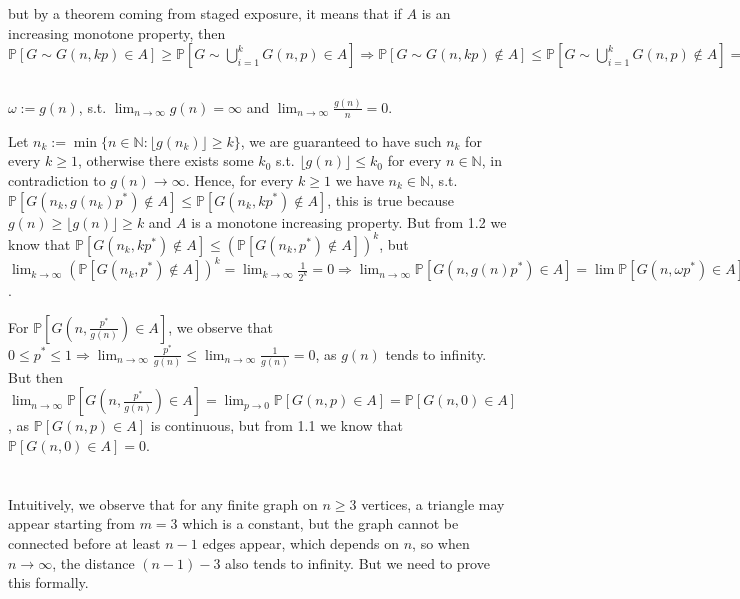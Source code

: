 \documentclass{article}
\begin{document}
but by a theorem coming from staged exposure, it means that if $A$ is an increasing monotone property, then $\mathbb{P}[G\sim{G(n,kp)}\in{A}]\geq{\mathbb{P}[G\sim\bigcup_{i=1}^{k}G(n,p)\in{A}]}\Rightarrow{\mathbb{P}[G\sim{G(n,kp)}\notin{A}]\leq{\mathbb{P}[G\sim\bigcup_{i=1}^{k}G(n,p)\notin{A}]}=(\mathbb{P}[G\sim{G(n,p)}\notin{A}]})^k$

\subsection{}
$\omega:=g(n)$, s.t. $\lim_{n\rightarrow\infty}g(n)=\infty$ and $\lim_{n\rightarrow\infty}\frac{g(n)}{n}=0$.

Let $n_k:=\min\{n\in\mathbb{N} : \lfloor{g(n_k)}\rfloor\geq{k}\}$, we are guaranteed to have such $n_k$ for every $k\geq{1}$, otherwise there exists some $k_0$ s.t. $\lfloor{g(n)}\rfloor\leq{k_0}$ for every $n\in\mathbb{N}$, in contradiction to $g(n)\rightarrow\infty$. 
Hence, for every $k\geq{1}$ we have $n_k\in\mathbb{N}$, s.t. $\mathbb{P}[G(n_k,g(n_k)p^{\ast})\notin{A}]\leq{\mathbb{P}[G(n_k,kp^{\ast})\notin{A}]}$, this is true because $g(n)\geq\lfloor{g(n)}\rfloor\geq{k}$ and $A$ is a monotone increasing property. But from 1.2 we know that $\mathbb{P}[G(n_k,kp^{\ast})\notin{A}]\leq{(\mathbb{P}[G(n_k,p^{\ast})\notin{A}])^k}$, but $\lim_{k\rightarrow\infty}(\mathbb{P}[G(n_k,p^{\ast})\notin{A}])^k=\lim_{k\rightarrow\infty}\frac{1}{2^k}=0\Rightarrow{\lim_{n\rightarrow\infty}\mathbb{P}[G(n,g(n){p^{\ast}})\in{A}]}=\lim\mathbb{P}[G(n,\omega{p^{\ast}})\in{A}]=1$.

For $\mathbb{P}[G(n,\frac{p^{\ast}}{g(n)})\in{A}]$, we observe that $0\leq{p^{\ast}}\leq{1}\Rightarrow{\lim_{n\rightarrow\infty}\frac{p^{\ast}}{g(n)}}\leq{\lim_{n\rightarrow\infty}\frac{1}{g(n)}}=0$, as $g(n)$ tends to infinity.
But then $\lim_{n\rightarrow\infty}\mathbb{P}[G(n,\frac{p^{\ast}}{g(n)})\in{A}]=\lim_{p\rightarrow{0}}\mathbb{P}[G(n,p)\in{A}]=\mathbb{P}[G(n,0)\in{A}]$, as $\mathbb{P}[G(n,p)\in{A}]$ is continuous, but from 1.1 we know that $\mathbb{P}[G(n,0)\in{A}]=0$.

\section{}
Intuitively, we observe that for any finite graph on $n\geq{3}$ vertices, a triangle may appear starting from $m=3$ which is a constant, but the graph cannot be connected before at least $n-1$ edges appear, which depends on $n$, so when $n\rightarrow\infty$, the distance $(n-1)-3$ also tends to infinity. But we need to prove this formally.
\end{document}
